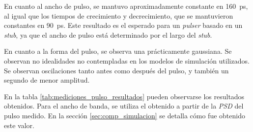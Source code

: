 En cuanto al ancho de pulso, se mantuvo aproximadamente constante en
\qty{160}{\pico\second}, al igual que los tiempos de crecimiento y
decrecimiento, que se mantuvieron constantes en \qty{90}{\pico\second}. Este
resultado es el esperado para un \textit{pulser} basado en un \textit{stub}, ya
que el ancho de pulso está determinado por el largo del \textit{stub}.

En cuanto a la forma del pulso, se observa una prácticamente gaussiana. Se
observan no idealidades no contempladas en los modelos de simulación utilizados.
Se observan oscilaciones tanto antes como después del pulso, y también un
segundo de menor amplitud.

En la tabla \ref{tab:mediciones_pulso_resultados} pueden observarse los resultados
obtenidos. Para el ancho de banda, se utiliza el obtenido a partir de la
\textit{PSD} del pulso medido. En la sección \ref{sec:comp_simulacion} se
detalla cómo fue obtenido este valor.

